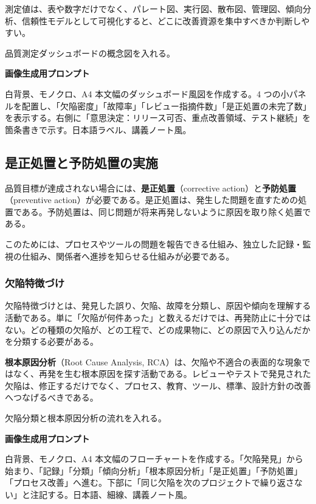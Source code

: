 \documentclass[11pt,a4paper]{article}
\newcommand{\term}[2]{\textbf{#1}（#2）}
\begin{document}
測定値は、表や数字だけでなく、パレート図、実行図、散布図、管理図、傾向分析、信頼性モデルとして可視化すると、どこに改善資源を集中すべきか判断しやすい。

\begin{todobox}
品質測定ダッシュボードの概念図を入れる。\par
\textbf{画像生成用プロンプト}\par
白背景、モノクロ、A4 本文幅のダッシュボード風図を作成する。4 つの小パネルを配置し、「欠陥密度」「故障率」「レビュー指摘件数」「是正処置の未完了数」を表示する。右側に「意思決定：リリース可否、重点改善領域、テスト継続」を箇条書きで示す。日本語ラベル、講義ノート風。
\end{todobox}

\subsection{是正処置と予防処置の実施}
品質目標が達成されない場合には、\term{是正処置}{corrective action}と\term{予防処置}{preventive action}が必要である。是正処置は、発生した問題を直すための処置である。予防処置は、同じ問題が将来再発しないように原因を取り除く処置である。

このためには、プロセスやツールの問題を報告できる仕組み、独立した記録・監視の仕組み、関係者へ進捗を知らせる仕組みが必要である。

\subsubsection{欠陥特徴づけ}
欠陥特徴づけとは、発見した誤り、欠陥、故障を分類し、原因や傾向を理解する活動である。単に「欠陥が何件あった」と数えるだけでは、再発防止に十分ではない。どの種類の欠陥が、どの工程で、どの成果物に、どの原因で入り込んだかを分類する必要がある。

\term{根本原因分析}{Root Cause Analysis, RCA}は、欠陥や不適合の表面的な現象ではなく、再発を生む根本原因を探す活動である。レビューやテストで発見された欠陥は、修正するだけでなく、プロセス、教育、ツール、標準、設計方針の改善へつなげるべきである。

\begin{todobox}
欠陥分類と根本原因分析の流れを入れる。\par
\textbf{画像生成用プロンプト}\par
白背景、モノクロ、A4 本文幅のフローチャートを作成する。「欠陥発見」から始まり、「記録」「分類」「傾向分析」「根本原因分析」「是正処置」「予防処置」「プロセス改善」へ進む。下部に「同じ欠陥を次のプロジェクトで繰り返さない」と注記する。日本語、細線、講義ノート風。
\end{todobox}
\end{document}
